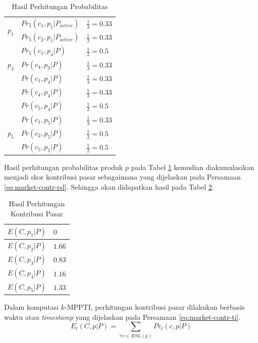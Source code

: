 \begin{small}
	\begin{longtable}{|p{1cm}|p{4cm}|p{3cm}|}
		\caption{Hasil Perhitungan Probabilitas}
		\label{tab:prob-res}
		\hline
		\multirow{2}{*}{$p_1$} & $Pr_5(c_1, p_1|P_{active})$ & $\frac{1}{3} = 0.33$ \\ \cline{2-3}
		& $Pr_5(c_2, p_1|P_{active})$ & $\frac{1}{3} = 0.33$ \\ \hline
		\multirow{3}{*}{$p_4$} & $Pr_5(c_1, p_4|P)$ & $\frac{1}{2} = 0.5$ \\ \cline{2-3}
		& $Pr(c_4, p_3|P)$ & $\frac{1}{3} = 0.33$  \\ \hline
		\multirow{3}{*}{$p_4$} & $Pr(c_1, p_4|P)$ & $\frac{1}{3} = 0.33$ \\ \cline{2-3}
		& $Pr(c_4, p_4|P)$ & $\frac{1}{3} = 0.33$  \\ \cline{2-3}
		& $Pr(c_5, p_4|P)$ & $\frac{1}{2} = 0.5$ \\ \hline
		\multirow{3}{*}{$p_5$} & $Pr(c_1, p_5|P)$ & $\frac{1}{3} = 0.33$ \\ \cline{2-3}
		& $Pr(c_2, p_5|P)$ & $\frac{1}{2} = 0.5$ \\ \cline{2-3}
		& $Pr(c_5, p_5|P)$ & $\frac{1}{2} = 0.5$ \\ \hline
	\end{longtable}
\end{small}


Hasil perhitungan probabilitas produk $p$ pada Tabel \ref{tab:prob-res} kemudian diakumulasikan menjadi skor kontribusi pasar sebagaimana yang dijelaskan pada Persamaan \ref{eq:market-contr-rsl}. Sehingga akan didapatkan hasil pada Tabel \ref{tab:mc-res}.

\begin{table}[H]
	\small
	\centering
	\begin{tabular}{|p{3cm}|p{2cm}|}
		\hline
		$E(C, p_1|P)$ & $0$ \\ \hline
		$E(C, p_2|P)$ & $1.66$ \\ \hline
		$E(C, p_3|P)$ & $0.83$ \\ \hline
		$E(C, p_4|P)$ & $1.16$ \\ \hline
		$E(C, p_5|P)$ & $1.33$ \\ \hline
	\end{tabular} 
	\caption{Hasil Perhitungan Kontribusi Pasar}
	\label{tab:mc-res}
\end{table}

Dalam komputasi $k$-MPPTI, perhitungan kontribusi pasar dilakukan berbasis waktu atau \textit{timestamp} yang dijelaskan pada Persamaan \ref{eq:market-contr-ti}.
\begin{equation}\label{eq:market-contr-ti}
E_t(C, p|P) = \sum_{\forall c \in RSL(p)} Pr_t(c, p|P)
\end{equation} 

